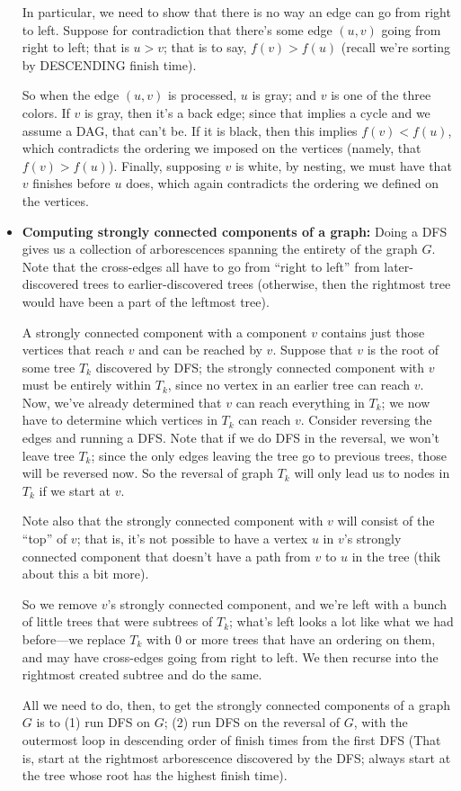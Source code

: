 \documentclass{article}
\begin{document}
\begin{itemize}
In particular, we need to show that there is no way an edge can go from right
to left.
Suppose for contradiction that there's some edge $(u,v)$ going from
right to left; that is $u > v$; that is to say, $f(v) > f(u)$ (recall we're
sorting by DESCENDING finish time).

So when the edge $(u,v)$ is processed, $u$ is gray; and $v$ is one of the three colors.
If $v$ is gray, then it's a back edge; since that implies a cycle and we assume
a DAG, that can't be.
If it is black, then this implies $f(v) < f(u)$, which contradicts the
ordering we imposed on the vertices (namely, that $f(v) > f(u)$).
Finally, supposing $v$ is white, by nesting, we must have that $v$
finishes before $u$ does, which again contradicts the ordering we defined on
the vertices.

\item
\textbf{Computing strongly connected components of a graph:}
Doing a DFS gives us a collection of arborescences spanning the entirety 
of the graph $G$.
Note that the cross-edges all have to go from ``right to left'' from later-
discovered trees to earlier-discovered trees (otherwise, then the
rightmost tree would have been a part of the leftmost tree).

A strongly connected component with a component $v$ contains just those vertices
that reach $v$ and can be reached by $v$.
Suppose that $v$ is the root of some tree $T_k$ discovered by DFS; the strongly
connected component with $v$ must be entirely within $T_k$, since no
vertex in an earlier tree can reach $v$.
Now, we've already determined that $v$ can reach everything in $T_k$; we now
have to determine which vertices in $T_k$ can reach $v$.
Consider reversing the edges and running a DFS.
Note that if we do DFS in the reversal, we won't leave tree $T_k$; since
the only edges leaving the tree go to previous trees, those will
be reversed now.
So the reversal of graph $T_k$ will only lead us to nodes in $T_k$ if we
start at $v$.

Note also that the strongly connected component with $v$ will consist
of the ``top'' of $v$; that is, it's not possible to have a vertex
$u$ in $v$'s strongly connected component that doesn't have a path from
$v$ to $u$ in the tree (thik about this a bit more).

So we remove $v$'s strongly connected component, and we're left with a bunch
of little trees that were subtrees of $T_k$; what's left looks a lot
like what we had before---we replace $T_k$ with 0 or more trees that have an
ordering on them, and may have cross-edges going from right to left.
We then recurse into the rightmost created subtree and do the same.

All we need to do, then, to get the strongly connected components of a graph
$G$ is to (1) run DFS on $G$; (2) run DFS on the reversal of $G$, with
the outermost loop in descending order of finish times from the first
DFS (That is, start at the rightmost arborescence discovered by the DFS;
always start at the tree whose root has the highest finish time).

\end{itemize}
\end{document}
